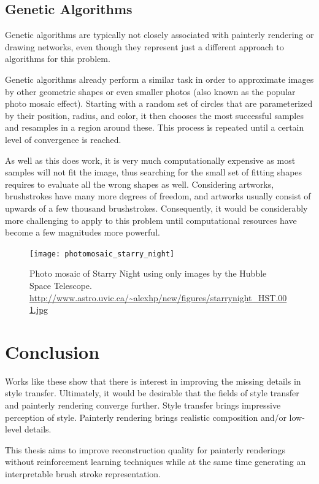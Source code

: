 \subsection{Genetic Algorithms}
Genetic algorithms are typically not closely associated with painterly rendering or drawing networks, even though they represent just a different approach to algorithms for this problem.

Genetic algorithms already perform a similar task in order to approximate images by other geometric shapes or even smaller photos (also known as the popular photo mosaic effect).
Starting with a random set of circles that are parameterized by their position, radius, and color, it then chooses the most successful samples and resamples in a region around these.
This process is repeated until a certain level of convergence is reached.


As well as this does work, it is very much computationally expensive as most samples will not fit the image, thus searching for the small set of fitting shapes requires to evaluate all the wrong shapes as well.
Considering artworks, brushstrokes have many more degrees of freedom, and artworks usually consist of upwards of a few thousand brushstrokes.
Consequently, it would be considerably more challenging to apply to this problem until computational resources have become a few magnitudes more powerful.

\begin{figure}
    \texttt{[image: photomosaic\_starry\_night]}
    \caption[]{Photo mosaic of Starry Night using only images by the Hubble Space Telescope. \url{http://www.astro.uvic.ca/~alexhp/new/figures/starrynight_HST.001.jpg}}
\end{figure}



\section{Conclusion}
Works like these show that there is interest in improving the missing details in style transfer.
Ultimately, it would be desirable that the fields of style transfer and painterly rendering converge further.
Style transfer brings impressive perception of style.
Painterly rendering brings realistic composition and/or low-level details.

This thesis aims to improve reconstruction quality for painterly renderings without reinforcement learning techniques while at the same time generating an interpretable brush stroke representation.
